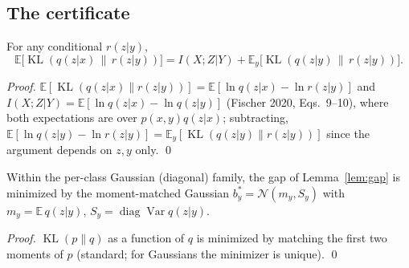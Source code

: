 \subsection{The certificate}

\begin{lemma}\label{lem:gap}
For any conditional $r(z|y)$,
\begin{equation}
\mathbb{E}\big[\operatorname{KL}(q(z|x)\,\|\,r(z|y))\big]
= I(X;Z|Y) + \mathbb{E}_y\big[\operatorname{KL}(q(z|y)\,\|\,r(z|y))\big] .
\label{eq:gap}
\end{equation}
\end{lemma}

\begin{proof}
$\mathbb{E}[\operatorname{KL}(q(z|x)\|r(z|y))] = \mathbb{E}[\ln q(z|x) - \ln r(z|y)]$
and $I(X;Z|Y) = \mathbb{E}[\ln q(z|x) - \ln q(z|y)]$ (Fischer 2020, Eqs.~9--10), where
both expectations are over $p(x,y)q(z|x)$; subtracting,
$\mathbb{E}[\ln q(z|y) - \ln r(z|y)] = \mathbb{E}_y[\operatorname{KL}(q(z|y)\|r(z|y))]$
since the argument depends on $z, y$ only. \hfill\qed
\end{proof}

\begin{lemma}\label{lem:mm}
Within the per-class Gaussian (diagonal) family, the gap of Lemma~\ref{lem:gap} is
minimized by the moment-matched Gaussian $b^*_y = \mathcal{N}(m_y, S_y)$ with
$m_y = \mathbb{E}\,q(z|y)$, $S_y = \operatorname{diag}\operatorname{Var} q(z|y)$.
\end{lemma}

\begin{proof}
$\operatorname{KL}(p\|q)$ as a function of $q$ is minimized by matching the first two
moments of $p$ (standard; for Gaussians the minimizer is unique). \hfill\qed
\end{proof}

